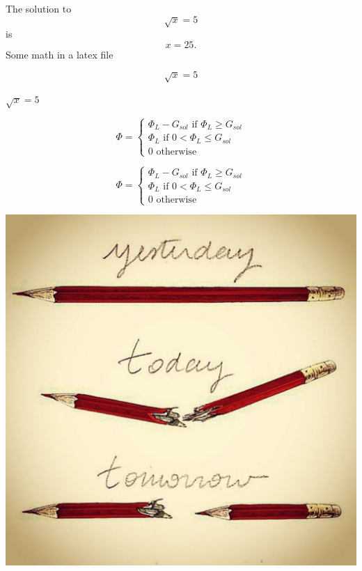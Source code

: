 \documentclass{article}
\begin{document}
The solution to \[\sqrt{x} = 5\] is \[x=25.\]
Some math in a latex file




\[\sqrt{x} = 5\]

\(\sqrt{x} = 5\)

$$
\Phi = \begin{cases}
\Phi_L - G_{sol} \text{ if } \Phi_L \geq G_{sol}\\
\Phi_L \text{ if }  0 <\Phi_L \leq G_{sol}\\
0 \text{ otherwise }
\end{cases}
$$

\begin{equation}
\Phi = \begin{cases}
\Phi_L - G_{sol} \text{ if } \Phi_L \geq G_{sol}\\
\Phi_L \text{ if }  0 <\Phi_L \leq G_{sol}\\
0 \text{ otherwise }
\end{cases}
\end{equation}

\includegraphics{test-image.jpg}
\end{document}
